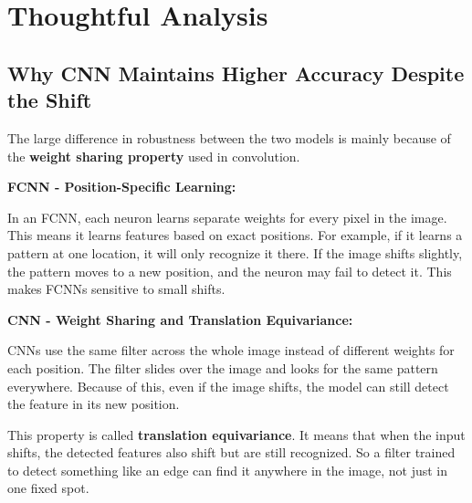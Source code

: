 \documentclass[11pt,a4paper]{article}
\begin{document}
\section{Thoughtful Analysis}

\subsection{Why CNN Maintains Higher Accuracy Despite the Shift}

The large difference in robustness between the two models is mainly because of the \textbf{weight sharing property} used in convolution.

\vspace{0.5em}

\textbf{FCNN - Position-Specific Learning:}

In an FCNN, each neuron learns separate weights for every pixel in the image. This means it learns features based on exact positions. For example, if it learns a pattern at one location, it will only recognize it there. If the image shifts slightly, the pattern moves to a new position, and the neuron may fail to detect it. This makes FCNNs sensitive to small shifts.

\vspace{0.5em}

\textbf{CNN - Weight Sharing and Translation Equivariance:}

CNNs use the same filter across the whole image instead of different weights for each position. The filter slides over the image and looks for the same pattern everywhere. Because of this, even if the image shifts, the model can still detect the feature in its new position.

This property is called \textbf{translation equivariance}. It means that when the input shifts, the detected features also shift but are still recognized. So a filter trained to detect something like an edge can find it anywhere in the image, not just in one fixed spot.

\vspace{0.5em}
\end{document}

